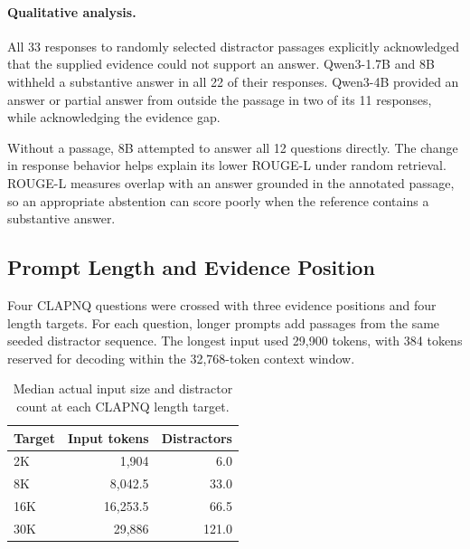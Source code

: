 \documentclass{article}
\begin{document}
\paragraph{Qualitative analysis.}

All 33 responses to randomly selected distractor passages explicitly acknowledged that the
supplied evidence could not support an answer. Qwen3-1.7B and 8B withheld a substantive answer
in all 22 of their responses. Qwen3-4B provided an answer or partial answer from outside the
passage in two of its 11 responses, while acknowledging the evidence gap.

Without a passage, 8B attempted to answer all 12 questions directly. The change in response
behavior helps explain its lower ROUGE-L under random retrieval. ROUGE-L measures overlap
with an answer grounded in the annotated passage, so an appropriate abstention can score poorly
when the reference contains a substantive answer.

\clearpage


\subsection{Prompt Length and Evidence Position}

Four CLAPNQ questions were crossed with three evidence positions and four length targets.
For each question, longer prompts add passages from the same seeded distractor sequence. The
longest input used 29,900 tokens, with 384 tokens reserved for decoding within the
32,768-token context window.

\begin{table}[H]
\centering
\caption{Median actual input size and distractor count at each CLAPNQ length target.}
\small
\begin{tabular*}{\columnwidth}{@{\extracolsep{\fill}}lrr@{}}
\toprule
\textbf{Target} & \textbf{Input tokens} & \textbf{Distractors} \\
\midrule
2K & 1,904 & 6.0 \\
8K & 8,042.5 & 33.0 \\
16K & 16,253.5 & 66.5 \\
30K & 29,886 & 121.0 \\
\bottomrule
\end{tabular*}
\end{table}
\end{document}
